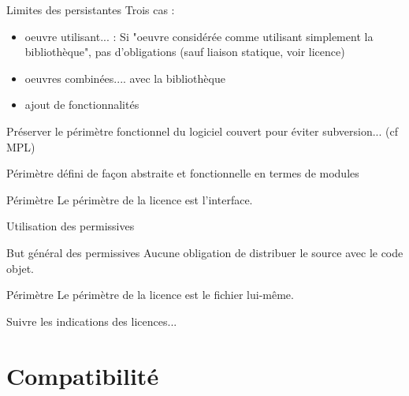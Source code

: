 \documentclass{beamer}
\begin{document}
\begin{frame}{Limites des persistantes}
Trois cas :
  \begin{itemize}
  \item oeuvre utilisant... : Si "oeuvre considérée comme utilisant simplement la bibliothèque", pas
    d'obligations (sauf liaison statique, voir licence)
  \item oeuvres combinées.... avec la bibliothèque
  \item ajout de fonctionnalités
  \end{itemize}

Préserver le périmètre fonctionnel du logiciel couvert pour éviter subversion... (cf MPL)

Périmètre défini de façon abstraite et fonctionnelle en termes de modules
 \begin{alertblock}{Périmètre}
    Le périmètre de la licence est l'interface.
  \end{alertblock}
  
\end{frame}


\begin{frame}{Utilisation des permissives}

  \begin{block}{But général des permissives}
    Aucune obligation de distribuer le source avec le code objet.
  \end{block}

  \begin{alertblock}{Périmètre}
    Le périmètre de la licence est le fichier lui-même.
  \end{alertblock}

  Suivre les indications des licences...

\end{frame}



\section{Compatibilité}
\end{document}
